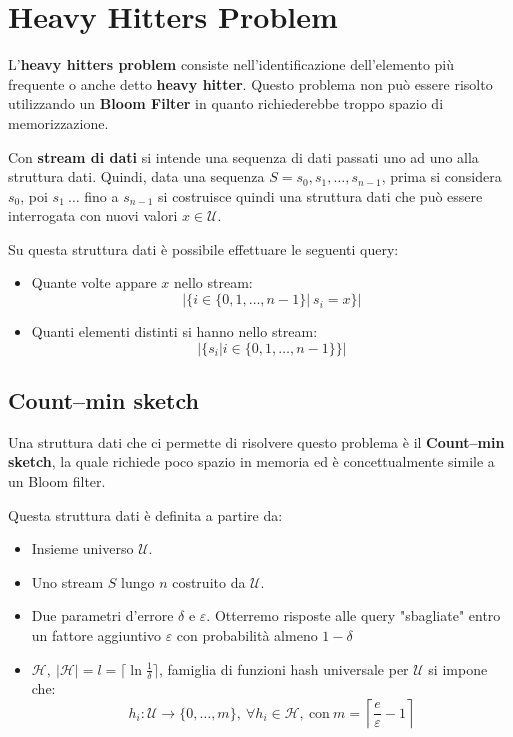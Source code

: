 \section{Heavy Hitters Problem}
L'\textbf{heavy hitters problem} consiste nell'identificazione dell'elemento più
frequente o anche detto \textbf{heavy hitter}. Questo problema non può essere
risolto utilizzando un \textbf{Bloom Filter} in quanto richiederebbe troppo spazio
di memorizzazione.
\begin{definizione}
    Con \textbf{stream di dati} si intende una sequenza di dati passati uno ad
    uno alla struttura dati. Quindi, data una sequenza $S = s_0,s_1, \dots ,s_{n-1}$,
    prima si considera $s_0$, poi $s_1 \ \dots$ fino a $s_{n-1}$ si costruisce
    quindi una struttura dati che può essere interrogata con nuovi valori $x \in \mathcal{U}$.
\end{definizione}

Su questa struttura dati è possibile effettuare le seguenti query:
\begin{itemize}
    \item Quante volte appare $x$ nello stream:
          \begin{equation}
              | \{ i \in \{0, 1, \dots, n - 1\}| \ s_i = x \}|
          \end{equation}
    \item Quanti elementi distinti si hanno nello stream:
          \begin{equation}
              |\{s_i | i \in \{0, 1, \dots, n - 1\}\}|
          \end{equation}
\end{itemize}
\subsection{Count–min sketch}
Una struttura dati che ci permette di risolvere questo problema è il
\textbf{Count–min sketch}, la quale richiede poco spazio in memoria ed è
concettualmente simile a un Bloom filter.

Questa struttura dati è definita a partire da:
\begin{itemize}
    \item Insieme universo $\mathcal{U}$.
    \item Uno stream $S$ lungo $n$ costruito da $\mathcal{U}$.
    \item Due parametri d'errore $\delta$ e $\varepsilon$. Otterremo risposte
          alle query "sbagliate" entro un fattore aggiuntivo $\varepsilon$ con probabilità
          almeno $1 - \delta$
    \item $\mathcal{H}, \ |\mathcal{H}| = l = \lceil \ln \frac{1}{\delta} \rceil$,
          famiglia di funzioni hash universale per $\mathcal{U}$ si impone che:
          \begin{equation}
              h_i: \mathcal{U} \to \{0, \dots, m\}, \ \forall h_i \in \mathcal{H}, \ \text{con} \ m = \left\lceil \frac{e}{\varepsilon} - 1 \right\rceil
          \end{equation}
\end{itemize}

